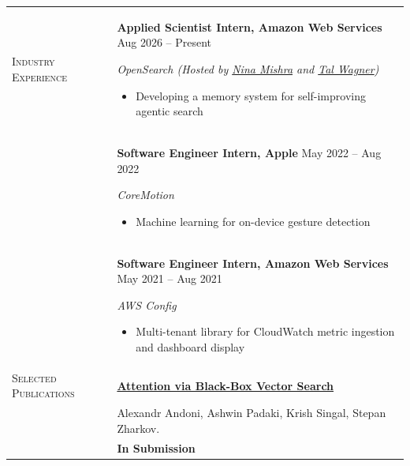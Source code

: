 \documentclass[10pt]{article}
\newlength{\lcol}\setlength{\lcol}{100pt}
\newlength{\rcol}\setlength{\rcol}{\dimexpr\textwidth-\lcol\relax}
\newcommand{\bluebf}[1]{{\color{customlinkcolor}\textbf{#1}}}
\newcommand{\sectionhead}[1]{\textsc{#1}}
\begin{document}
\begin{longtable}{@{}p{\lcol}@{}p{\rcol}@{}}
\sectionhead{Industry \newline Experience} &
\textbf{Applied Scientist Intern, Amazon Web Services} \hfill Aug 2026 -- Present\par
\vspace{0.15em}
\textit{OpenSearch (Hosted by \href{https://theory.stanford.edu/~nmishra/}{Nina Mishra} and \href{https://talwagner.github.io/}{Tal Wagner})}\par
\vspace{0.15em}
\begin{itemize}[leftmargin=1.5em, itemsep=0pt, topsep=0pt, parsep=0pt, partopsep=0pt, after=\vspace{0pt}]
  \item Developing a memory system for self-improving agentic search
\end{itemize}
\\[2pt]
& \textbf{Software Engineer Intern, Apple} \hfill May 2022 -- Aug 2022\par
\vspace{0.15em}
\textit{CoreMotion}\par
\vspace{0.15em}
\begin{itemize}[leftmargin=1.5em, itemsep=0pt, topsep=0pt, parsep=0pt, partopsep=0pt, after=\vspace{0pt}]
  \item Machine learning for on-device gesture detection
\end{itemize}
\\[2pt]
& \textbf{Software Engineer Intern, Amazon Web Services} \hfill May 2021 -- Aug 2021\par
\vspace{0.15em}
\textit{AWS Config}\par
\vspace{0.15em}
\begin{itemize}[leftmargin=1.5em, itemsep=0pt, topsep=0pt, parsep=0pt, partopsep=0pt, after=\vspace{0pt}]
  \item Multi-tenant library for CloudWatch metric ingestion and dashboard display
\end{itemize}
\\[10pt]

\sectionhead{Selected \newline Publications} &
\vspace{-0.5em} \bluebf{\href{https://arxiv.org/abs/2610.10135}{Attention via Black-Box Vector Search}} \\ [-0.9em]
& Alexandr Andoni, Ashwin Padaki, Krish Singal, Stepan Zharkov.\\
& \textbf{In Submission} \\[6pt]


\end{longtable}
\end{document}
